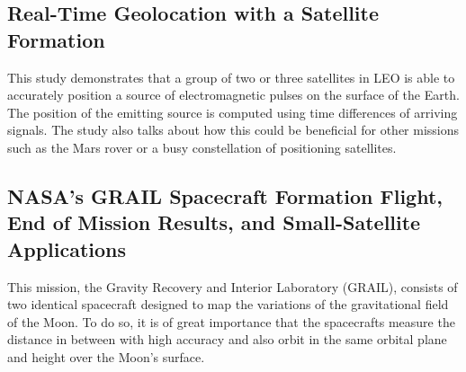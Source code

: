 \subsection{Real-Time Geolocation with a Satellite Formation}
\label{geolocation}

This study demonstrates that a group of two or three satellites in
LEO is able to accurately position a source of electromagnetic pulses
on the surface of the Earth. The position of the emitting source is
computed using time differences of arriving signals. The study also
talks about how this could be beneficial for other missions such as
the Mars rover or a busy constellation of positioning satellites.\cite{Leiter_Geoloc}

\subsection{NASA\textquoteright{}s GRAIL Spacecraft Formation Flight, End of Mission Results, and Small-Satellite Applications}
\label{grail}

This mission, the Gravity Recovery and Interior Laboratory (GRAIL),
consists of two identical spacecraft designed to map the variations
of the gravitational field of the Moon. To do so, it is of great importance
that the spacecrafts measure the distance in between with high accuracy
and also orbit in the same orbital plane and height over the Moon's
surface.\cite{Edward_GRAIL}
